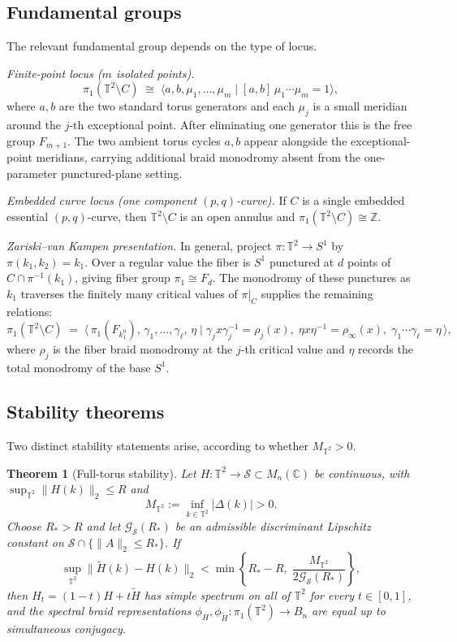 \documentclass[11pt]{article}
\newtheorem{theorem}{Theorem}[section]
\numberwithin{equation}{section}
\newcommand{\bbC}{\mathbb C}
\newcommand{\bbZ}{\mathbb Z}
\newcommand{\bbT}{\mathbb T}
\newcommand{\cG}{\mathcal G}
\newcommand{\cS}{\mathcal S}
\begin{document}
\subsection{Fundamental groups}

The relevant fundamental group depends on the type of locus.

\emph{Finite-point locus (\(m\) isolated points).}
\[
  \pi_1(\bbT^2\setminus C)
  \;\cong\;
  \langle a,b,\mu_1,\dots,\mu_m\mid [a,b]\,\mu_1\cdots\mu_m=1\rangle,
\]
where \(a,b\) are the two standard torus generators and each \(\mu_j\) is a
small meridian around the \(j\)-th exceptional point.  After eliminating one
generator this is the free group \(F_{m+1}\).  The two ambient torus cycles
\(a,b\) appear alongside the exceptional-point meridians, carrying additional
braid monodromy absent from the one-parameter punctured-plane setting.

\emph{Embedded curve locus (one component \((p,q)\)-curve).}
If \(C\) is a single embedded essential \((p,q)\)-curve, then
\(\bbT^2\setminus C\) is an open annulus and
\(\pi_1(\bbT^2\setminus C)\cong\bbZ\).

\emph{Zariski--van Kampen presentation.}
In general, project \(\pi:\bbT^2\to S^1\) by \(\pi(k_1,k_2)=k_1\).
Over a regular value the fiber is \(S^1\) punctured at \(d\) points of
\(C\cap\pi^{-1}(k_1)\), giving fiber group \(\pi_1\cong F_d\).  The
monodromy of these punctures as \(k_1\) traverses the finitely many critical
values of \(\pi|_C\) supplies the remaining relations:
\[
  \pi_1(\bbT^2\setminus C)\;=\;
  \bigl\langle\,\pi_1(F_{k_1^0}),\,\gamma_1,\dots,\gamma_\ell,\,\eta\;\big|\;
  \gamma_j x\gamma_j^{-1}=\rho_j(x),\;\eta x\eta^{-1}=\rho_\infty(x),\;
  \gamma_1\cdots\gamma_\ell=\eta\,\bigr\rangle,
\]
where \(\rho_j\) is the fiber braid monodromy at the \(j\)-th critical value
and \(\eta\) records the total monodromy of the base \(S^1\).

\subsection{Stability theorems}

Two distinct stability statements arise, according to whether \(M_{\bbT^2}>0\).

\begin{theorem}[Full-torus stability]\label{thm:torus-full}
Let \(H:\bbT^2\to\cS\subset M_n(\bbC)\) be continuous, with
\(\sup_{\bbT^2}\|H(k)\|_2\le R\) and
\[
  M_{\bbT^2}:=\inf_{k\in\bbT^2}|\Delta(k)|>0.
\]
Choose \(R_*>R\) and let \(\cG_\cS(R_*)\) be an admissible discriminant
Lipschitz constant on \(\cS\cap\{\|A\|_2\le R_*\}\).  If
\[
  \sup_{\bbT^2}\|\widetilde H(k)-H(k)\|_2
  <
  \min\!\left\{R_*-R,\;\frac{M_{\bbT^2}}{2\cG_\cS(R_*)}\right\},
\]
then \(H_t=(1-t)H+t\widetilde H\) has simple spectrum on all of \(\bbT^2\)
for every \(t\in[0,1]\), and the spectral braid representations
\(\phi_H,\phi_{\widetilde H}:\pi_1(\bbT^2)\to B_n\) are equal up to
simultaneous conjugacy.
\end{theorem}
\end{document}

